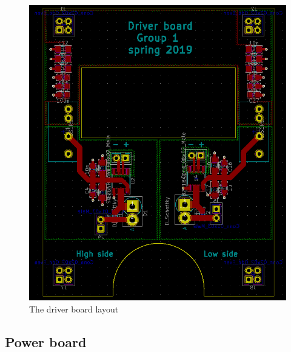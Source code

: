 \begin{figure} [H]
  \centering
  \includegraphics[width=\linewidth]{pictures/hardware/Driver_Board/driver_layout.png}
  \caption{The driver board layout}
  \label{fig:driver_layout}
\end{figure}

\subsection{Power board}
